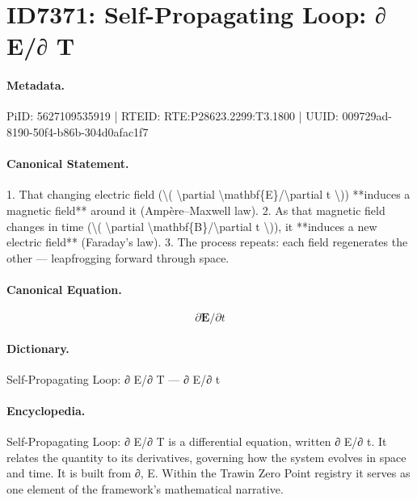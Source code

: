 \section*{ID7371: Self-Propagating Loop: ∂ E/∂ T}
\paragraph{Metadata.}
PiID: 5627109535919 | RTEID: RTE:P28623.2299:T3.1800 | UUID: 009729ad-8190-50f4-b86b-304d0afac1f7

\paragraph{Canonical Statement.}
1. That changing electric field (\textbackslash{}( \textbackslash{}partial \textbackslash{}mathbf\{E\}/\textbackslash{}partial t \textbackslash{})) **induces a magnetic field** around it (Ampère–Maxwell law). 2. As that magnetic field changes in time (\textbackslash{}( \textbackslash{}partial \textbackslash{}mathbf\{B\}/\textbackslash{}partial t \textbackslash{})), it **induces a new electric field** (Faraday’s law). 3. The process repeats: each field regenerates the other — leapfrogging forward through space.

\paragraph{Canonical Equation.}
\[
\partial \mathbf{E}/\partial t
\]

\paragraph{Dictionary.}
Self-Propagating Loop: ∂ E/∂ T — ∂ E/∂ t

\paragraph{Encyclopedia.}
Self-Propagating Loop: ∂ E/∂ T is a differential equation, written ∂ E/∂ t. It relates the quantity to its derivatives, governing how the system evolves in space and time. It is built from ∂, E. Within the Trawin Zero Point registry it serves as one element of the framework's mathematical narrative.
